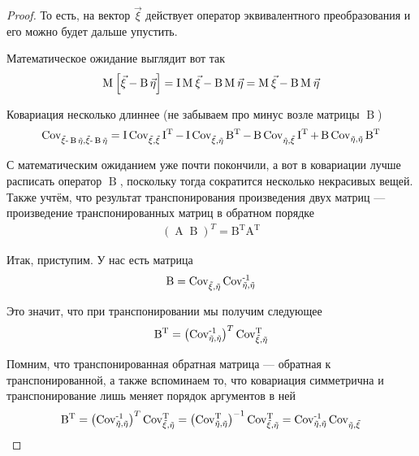 \begin{proof}
  То есть, на вектор $\vec{\xi}$ действует оператор эквивалентного
  преобразования и его можно будет дальше упустить.

  Математическое ожидание выглядит вот так
  \begin{align*}
      \Mean{\vec{\xi} - \operatorname{B} \vec{\eta}}
      = \operatorname{I} \mean{\vec{\xi}} - \operatorname{B} \mean{\vec{\eta}}
      = \mean{\vec{\xi}} - \operatorname{B} \mean{\vec{\eta}}
  \end{align*}

  Ковариация несколько длиннее (не забываем про минус возле матрицы
  $\operatorname{B}$)
  \begin{equation}\label{eq:gaussianVector:independent:covariation}
      \dCov{\vec{\xi} - \operatorname{B} \vec{\eta}}
      = \operatorname{I} \dCov{\vec{\xi}} \operatorname{I^T}
      - \operatorname{I} \Cov{\vec{\xi}}{\vec{\eta}} \operatorname{B^T}
      - \operatorname{B} \Cov{\vec{\eta}}{\vec{\xi}} \operatorname{I^T}
      + \operatorname{B} \dCov{\vec{\eta}} \operatorname{B^T}
  \end{equation}

  С математическим ожиданием уже почти покончили, а вот в ковариации лучше
  расписать оператор $\operatorname{B}$, поскольку тогда сократится несколько
  некрасивых вещей. Также учтём, что результат транспонирования произведения
  двух матриц --- произведение транспонированных матриц в обратном порядке
  \begin{align*}
      \left( \operatorname{A} \operatorname{B} \right)^T
      = \operatorname{B^T} \operatorname{A^T}
  \end{align*}

  Итак, приступим. У нас есть матрица
  \begin{align*}
      \operatorname{B} = \Cov{\vec{\xi}}{\vec{\eta}} \dCov[-1]{\vec{\eta}}
  \end{align*}

  Это значит, что при транспонировании мы получим следующее
  \begin{align*}
      \operatorname{B^T}
      = \left( \dCov[-1]{\vec{\eta}} \right)^T
          \Cov[T]{\vec{\xi}}{\vec{\eta}}
  \end{align*}

  Помним, что транспонированная обратная матрица --- обратная к
  транспонированной, а также вспоминаем то, что ковариация симметрична
  и транспонирование лишь меняет порядок аргументов в ней
  \begin{align*}
      \operatorname{B^T}
      = \left( \dCov[-1]{\vec{\eta}} \right)^T
          \Cov[T]{\vec{\xi}}{\vec{\eta}}
      = \left( \dCov[T]{\vec{\eta}} \right)^{-1}
          \Cov[T]{\vec{\xi}}{\vec{\eta}}
      = \dCov[-1]{\vec{\eta}} \Cov{\vec{\eta}}{\vec{\xi}}
  \end{align*}


\end{proof}
